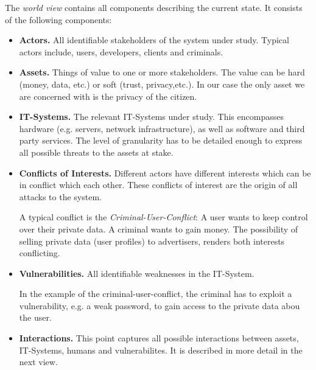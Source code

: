 The \emph{world view} contains all components describing the current state.
It consists of the following components:
\begin{itemize}
\item \textbf{Actors.}
All identifiable stakeholders of the system under study.
Typical actors include, users, developers, clients and criminals.

\item
\textbf{Assets.} Things of value to one or more stakeholders.
The value can be hard (money, data, etc.) or soft (trust, privacy,etc.).
In our case the only asset we are concerned with is the privacy of the citizen.

\item \textbf{IT-Systems.}
The relevant IT-Systems under study. This encompasses hardware (e.g. servers, network infrastructure), as well as software and third party services.
The level of granularity has to be detailed enough to express all possible threats to the assets at stake.

\item \textbf{Conflicts of Interests.}
Different actors have different interests which can be in conflict which each other.
These conflicts of interest are the origin of all attacks to the system.

A typical conflict is the \emph{Criminal-User-Conflict}:
A user wants to keep control over their private data.
A criminal wants to gain money.
The possibility of selling private data (user profiles) to advertisers, renders both interests conflicting.

\item \textbf{Vulnerabilities.}
All identifiable weaknesses in the IT-System.

In the example of the criminal-user-conflict, the criminal has to exploit a vulnerability, e.g. a weak password, to gain access to the private data abou the user.

\item \textbf{Interactions.}
This point captures all possible interactions between assets, IT-Systems, humans and vulnerabilites.
It is described in more detail in the next view.
\end{itemize}




